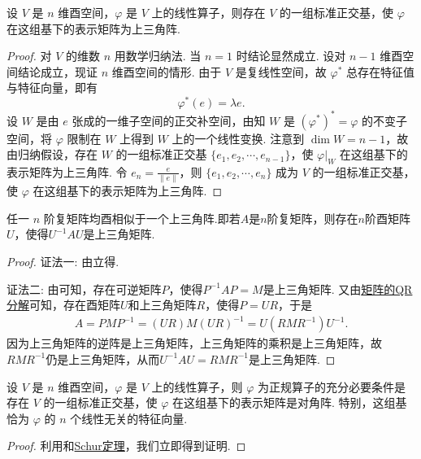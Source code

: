 \documentclass[../../main.tex]{subfiles}%
\begin{document}
\begin{theorem}[Schur(舒尔)定理]\label{theorem:Schur(舒尔)定理}
设 $V$ 是 $n$ 维酉空间，$\varphi$ 是 $V$ 上的线性算子，则存在 $V$ 的一组标准正交基，使 $\varphi$ 在这组基下的表示矩阵为上三角阵.
\end{theorem}
\begin{proof}

对 $V$ 的维数 $n$ 用数学归纳法. 当 $n = 1$ 时结论显然成立. 设对 $n - 1$ 维酉空间结论成立，现证 $n$ 维酉空间的情形. 由于 $V$ 是复线性空间，故 $\varphi^*$ 总存在特征值与特征向量，即有
\[
\varphi^*(e) = \lambda e.
\]
设 $W$ 是由 $e$ 张成的一维子空间的正交补空间，由知 $W$ 是 $(\varphi^*)^* = \varphi$ 的不变子空间，将 $\varphi$ 限制在 $W$ 上得到 $W$ 上的一个线性变换. 注意到 $\dim W = n - 1$，故由归纳假设，存在 $W$ 的一组标准正交基 $\{e_1,e_2,\cdots,e_{n - 1}\}$，使 $\varphi|_W$ 在这组基下的表示矩阵为上三角阵. 令 $e_n = \frac{e}{\|e\|}$，则 $\{e_1,e_2,\cdots,e_n\}$ 成为 $V$ 的一组标准正交基，使 $\varphi$ 在这组基下的表示矩阵为上三角阵.

\end{proof}

\begin{corollary}[Schur定理]\label{corollary:Schur(舒尔)定理}
任一 $n$ 阶复矩阵均酉相似于一个上三角阵.即若\(A\)是\(n\)阶复矩阵，则存在\(n\)阶酉矩阵\(U\)，使得\(U^{-1}AU\)是上三角矩阵.
\end{corollary}
\begin{proof}

{\color{blue}证法一:}
由立得.

{\color{blue}证法二:}
由可知，存在可逆矩阵\(P\)，使得\(P^{-1}AP = M\)是上三角矩阵. 又由\hyperref[theorem:矩阵的QR分解]{矩阵的QR分解}可知，存在酉矩阵\(U\)和上三角矩阵\(R\)，使得\(P = UR\)，于是
\begin{align*}
A = PMP^{-1}=(UR)M(UR)^{-1}=U(RMR^{-1})U^{-1}.
\end{align*}
因为上三角矩阵的逆阵是上三角矩阵，上三角矩阵的乘积是上三角矩阵，故\(RMR^{-1}\)仍是上三角矩阵，从而\(U^{-1}AU = RMR^{-1}\)是上三角矩阵. 

\end{proof}

\begin{theorem}
设 $V$ 是 $n$ 维酉空间，$\varphi$ 是 $V$ 上的线性算子，则 $\varphi$ 为正规算子的充分必要条件是存在 $V$ 的一组标准正交基，使 $\varphi$ 在这组基下的表示矩阵是对角阵. 特别，这组基恰为 $\varphi$ 的 $n$ 个线性无关的特征向量.
\end{theorem}
\begin{proof}

利用和\hyperref[corollary:Schur(舒尔)定理]{Schur定理}，我们立即得到证明.

\end{proof}
\end{document}

